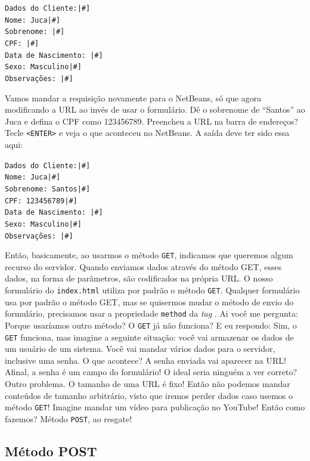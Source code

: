 \texttt{Dados do Cliente:|\#]}\\
\texttt{Nome: Juca|\#]}\\
\texttt{Sobrenome: |\#]}\\
\texttt{CPF: |\#]}\\
\texttt{Data de Nascimento: |\#]}\\
\texttt{Sexo: Masculino|\#]}\\
\texttt{Observações: |\#]}

Vamos mandar a requisição novamente para o NetBeans, só que agora modificando a URL ao invés de usar o formulário. Dê o sobrenome de ``Santos'' ao Juca e defina o CPF como 123456789. Preencheu a URL na barra de endereços? Tecle \texttt{<ENTER>} e veja o que aconteceu no NetBeans. A saída deve ter sido essa aqui:

\texttt{Dados do Cliente:|\#]}\\
\texttt{Nome: Juca|\#]}\\
\texttt{Sobrenome: Santos|\#]}\\
\texttt{CPF: 123456789|\#]}\\
\texttt{Data de Nascimento: |\#]}\\
\texttt{Sexo: Masculino|\#]}\\
\texttt{Observações: |\#]}

Então, basicamente, ao usarmos o método \texttt{GET}, indicamos que queremos algum recurso do servidor. Quando enviamos dados através do método GET, esses dados, na forma de parâmetros, são codificados na própria URL. O nosso formulário do \texttt{index.html} utiliza por padrão o método \texttt{GET}. Qualquer formulário usa por padrão o método GET, mas se quisermos mudar o método de envio do formulário, precisamos usar a propriedade \texttt{method} da \textit{tag} . Ai você me pergunta: Porque usaríamos outro método? O \texttt{GET} já não funciona? E eu respondo: Sim, o \texttt{GET} funciona, mas imagine a seguinte situação: você vai armazenar os dados de um usuário de um sistema. Você vai mandar vários dados para o servidor, inclusive uma senha. O que acontece? A senha enviada vai aparecer na URL! Afinal, a senha é um campo do formulário! O ideal seria ninguém a ver correto? Outro problema. O tamanho de uma URL é fixo! Então não podemos mandar conteúdos de tamanho arbitrário, visto que iremos perder dados caso usemos o método \texttt{GET}! Imagine mandar um vídeo para publicação no YouTube! Então como fazemos? Método \texttt{POST}, ao resgate!


\subsection{Método POST}

